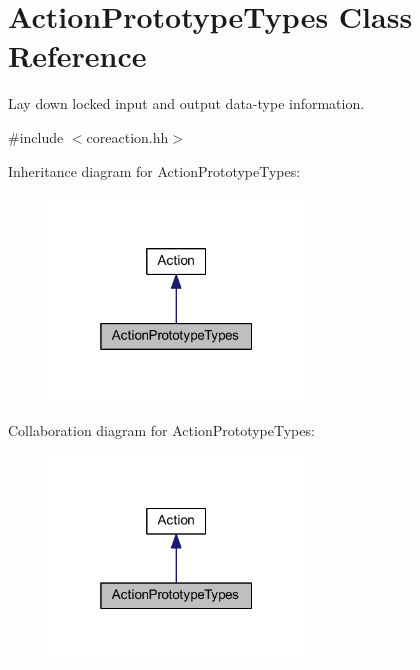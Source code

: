 \hypertarget{class_action_prototype_types}{}\section{Action\+Prototype\+Types Class Reference}
\label{class_action_prototype_types}


Lay down locked input and output data-\/type information.  




{\ttfamily \#include $<$coreaction.\+hh$>$}



Inheritance diagram for Action\+Prototype\+Types\+:
\nopagebreak
\begin{figure}[H]
\begin{center}
\leavevmode
\includegraphics[width=193pt]{class_action_prototype_types__inherit__graph}
\end{center}
\end{figure}


Collaboration diagram for Action\+Prototype\+Types\+:
\nopagebreak
\begin{figure}[H]
\begin{center}
\leavevmode
\includegraphics[width=193pt]{class_action_prototype_types__coll__graph}
\end{center}
\end{figure}

